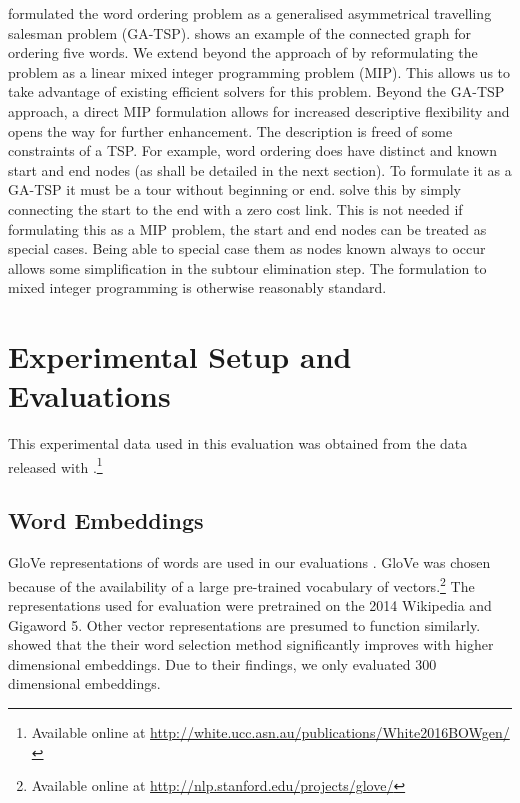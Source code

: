 \documentclass[compsoc]{IEEEtran}
\theoremstyle{plain}
\theoremstyle{definition}
\begin{document}
\textcite{Horvat2014} formulated the word ordering problem as a generalised asymmetrical travelling salesman problem (GA-TSP).  shows an example of the connected graph for ordering five words. We extend beyond the approach of \textcite{Horvat2014} by reformulating the problem as a linear mixed integer programming problem (MIP). This allows us to take advantage of existing efficient solvers for this problem. 
Beyond the GA-TSP approach, a direct MIP formulation allows for increased descriptive flexibility and opens the way for further enhancement. The description is freed of some constraints of a TSP.  For example, word ordering does have distinct and known start and end nodes (as shall be detailed in the next section). To formulate it as a GA-TSP it must be a tour without beginning or end. \textcite{Horvat2014} solve this by simply connecting the start to the end with a zero cost link. This is not needed if formulating this as a MIP problem, the start and end nodes can be treated as special cases. Being able to special case them as nodes known always to occur allows some simplification in the subtour elimination step. The formulation to mixed integer programming is otherwise reasonably standard.




\section{Experimental Setup and Evaluations} \label{evalsettings}
This experimental data used in this evaluation was
obtained from the data released with \textcite{White2015BOWgen}.\footnote{Available online at \url{http://white.ucc.asn.au/publications/White2016BOWgen/}}
\subsection{Word Embeddings}
GloVe representations of words are used in our evaluations \parencite{pennington2014glove}. GloVe was chosen because of the availability of a large pre-trained vocabulary of vectors.\footnote{Available online at \url{http://nlp.stanford.edu/projects/glove/}} The representations used for evaluation were pretrained on the 2014 Wikipedia and Gigaword 5.  Other vector representations are presumed to function similarly.
\textcite{White2015BOWgen} showed that the their word selection method significantly improves with higher dimensional embeddings. Due to their findings, we only evaluated 300 dimensional embeddings.
\end{document}
